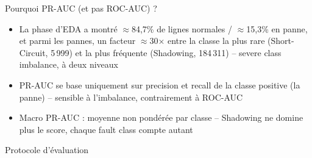 \documentclass[10pt,aspectratio=169]{beamer}
\begin{document}
\begin{frame}{Pourquoi PR-AUC (et pas ROC-AUC) ?}
  \footnotesize
  \begin{itemize}
    \item La phase d'EDA a montré $\approx$84,7\% de lignes normales / $\approx$15,3\% en panne, et parmi les pannes, un facteur $\approx$30$\times$ entre la classe la plus rare (Short-Circuit, 5\,999) et la plus fréquente (Shadowing, 184\,311) -- severe class imbalance, à deux niveaux
    \item PR-AUC se base uniquement sur precision et recall de la classe positive (la panne) -- sensible à l'imbalance, contrairement à ROC-AUC
    \item \alert{Macro PR-AUC} : moyenne non pondérée par classe -- Shadowing ne domine plus le score, chaque fault class compte autant
  \end{itemize}
\end{frame}

\begin{frame}{Protocole d'évaluation}
  \centering
\end{frame}
\end{document}
